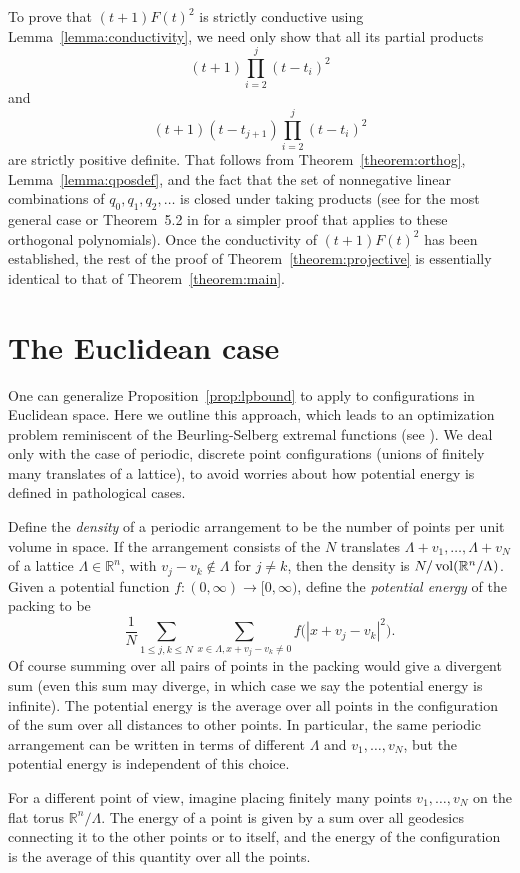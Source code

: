 \documentclass{jams-l}
\theoremstyle{plain}
\numberwithin{theorem}{section}
\theoremstyle{definition}
\numberwithin{equation}{section}
\newcommand{\R}{{\mathbb R}}
\newcommand{\vol}{\mathop{\textup{vol}}}
\newcommand{\co}{\colon}
\begin{document}
To prove that $(t+1)F(t)^2$ is strictly conductive using
Lemma~\ref{lemma:conductivity}, we need only show that all its
partial products
$$
(t+1)\prod_{i=2}^j (t-t_i)^2
$$
and
$$
(t+1)(t-t_{j+1})\prod_{i=2}^j (t-t_i)^2
$$
are strictly positive definite. That follows from
Theorem~\ref{theorem:orthog}, Lemma~\ref{lemma:qposdef}, and the
fact that the set of nonnegative linear combinations of
$q_0,q_1,q_2,\dots$ is closed under taking products (see
\cite{Gas} for the most general case or Theorem~5.2 in
\cite[p.~44]{A} for a simpler proof that applies to these
orthogonal polynomials).  Once the conductivity of $(t+1)F(t)^2$
has been established, the rest of the proof of
Theorem~\ref{theorem:projective} is essentially identical to that
of Theorem~\ref{theorem:main}.

\section{The Euclidean case} \label{sec:Euclidean}

One can generalize Proposition~\ref{prop:lpbound} to apply to
configurations in Euclidean space.  Here we outline this approach,
which leads to an optimization problem reminiscent of the
Beurling-Selberg extremal functions (see \cite{V}). We deal only
with the case of periodic, discrete point configurations (unions
of finitely many translates of a lattice), to avoid worries about
how potential energy is defined in pathological cases.

Define the \textit{density\/} of a periodic arrangement to be the
number of points per unit volume in space.  If the arrangement
consists of the $N$ translates $\Lambda+v_1,\dots,\Lambda+v_N$ of
a lattice $\Lambda \in \R^n$, with $v_j-v_k \not\in \Lambda$ for
$j \ne k$, then the density is $N/\vol(\R^n/\Lambda)$.  Given a
potential function $f \co (0,\infty) \to [0,\infty)$, define the
\textit{potential energy\/} of the packing to be
$$
\frac{1}{N}\sum_{1 \le j,k \le N} \sum_{x \in \Lambda, x+v_j-v_k
\ne 0} f\big(|x+v_j-v_k|^2\big).
$$
Of course summing over all pairs of points in the packing would
give a divergent sum (even this sum may diverge, in which case we
say the potential energy is infinite). The potential energy is the
average over all points in the configuration of the sum over all
distances to other points. In particular, the same periodic
arrangement can be written in terms of different $\Lambda$ and
$v_1,\dots,v_N$, but the potential energy is independent of this
choice.

For a different point of view, imagine placing finitely many
points $v_1,\dots,v_N$ on the flat torus $\R^n/\Lambda$. The
energy of a point is given by a sum over all geodesics connecting
it to the other points or to itself, and the energy of the
configuration is the average of this quantity over all the points.
\end{document}
